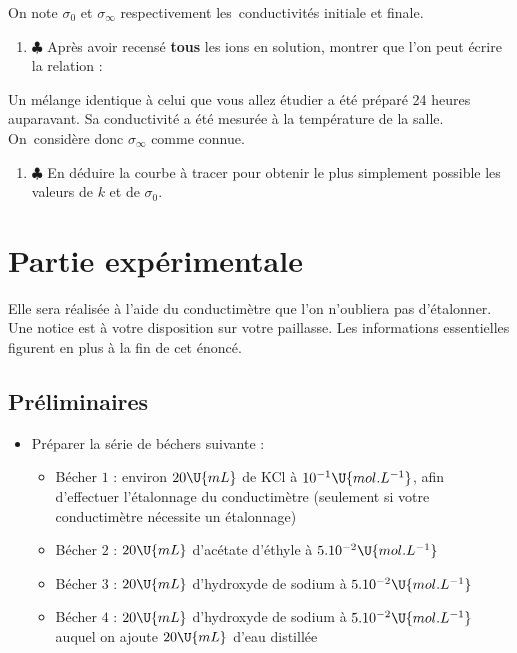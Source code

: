 \documentclass{tp}
\begin{document}
\medskip

\indent On note $\sigma_0$ et $\sigma_{\infty}$ respectivement les~conductivités initiale et finale.

\begin{enumerate}
\setcounter{enumi}{\thesave}

\item $\clubsuit$ Après avoir recensé \textbf{tous} les ions en solution, montrer que l'on peut écrire la relation : 


\end{enumerate}

\indent Un mélange identique à celui que vous allez étudier a été préparé 24 heures auparavant. Sa conductivité a été mesurée à la température de la salle. On~considère donc $\sigma_{\infty}$ comme connue.

\begin{enumerate}
\setcounter{enumi}{\thesave}

\item $\clubsuit$ En déduire la courbe à tracer pour obtenir le plus simplement possible les valeurs de $k$ et de $\sigma_0$.

\end{enumerate}

\section{Partie expérimentale}

Elle sera réalisée à l'aide du conductimètre que l'on n'oubliera pas d'étalonner. Une notice est à votre disposition sur votre paillasse. Les informations essentielles figurent en plus à la fin de cet énoncé.

\subsection{Préliminaires}

\begin{itemize}
\item [\textbullet] Préparer la série de béchers suivante :
  \begin{itemize}
  \item	Bécher $1$ : environ $20 \U{mL}$ de KCl à $10^{-1} \U{mol.L^{-1}}$, afin d'effectuer l'étalonnage du conductimètre (seulement si votre conductimètre nécessite un étalonnage)
  \item	Bécher $2$ : $20 \U{mL}$ d'acétate d'éthyle à $5.10^{-2} \U{mol.L^{-1}}$
  \item	Bécher $3$ : $20 \U{mL}$ d'hydroxyde de sodium à $5.10^{-2} \U{mol.L^{-1}}$
  \item	Bécher $4$ : $20 \U{mL}$ d'hydroxyde de sodium à $5.10^{-2} \U{mol.L^{-1}}$ auquel on ajoute $20 \U{mL}$ d'eau distillée
  \end{itemize}
\end{itemize}
	
\end{document}

